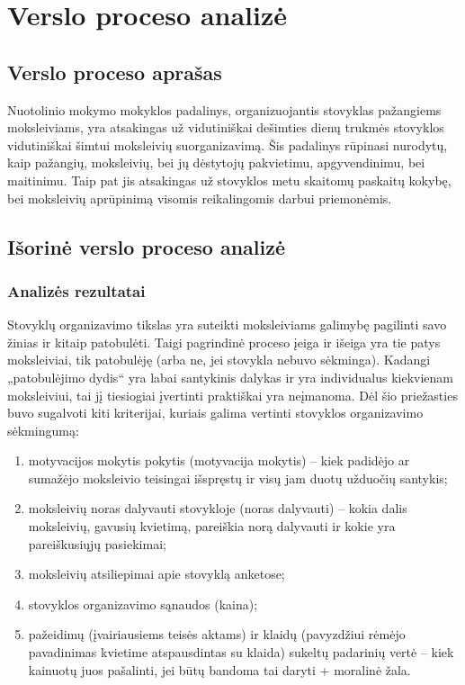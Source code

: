 \chapter{Verslo proceso analizė}


\section{Verslo proceso aprašas}

Nuotolinio mokymo mokyklos padalinys, organizuojantis stovyklas pažangiems
moksleiviams, yra atsakingas už vidutiniškai dešimties dienų trukmės
stovyklos vidutiniškai šimtui moksleivių suorganizavimą. Šis padalinys
rūpinasi nurodytų, kaip pažangių, moksleivių, bei jų dėstytojų pakvietimu, 
apgyvendinimu, bei maitinimu. Taip pat jis atsakingas už stovyklos metu 
skaitomų paskaitų kokybę, bei moksleivių aprūpinimą visomis reikalingomis
darbui priemonėmis.

\section{Išorinė verslo proceso analizė}

\subsection{Analizės rezultatai}

Stovyklų organizavimo tikslas yra suteikti moksleiviams galimybę pagilinti
savo žinias ir kitaip patobulėti. Taigi pagrindinė proceso įeiga ir išeiga
yra tie patys moksleiviai, tik patobulėję (arba ne, jei stovykla nebuvo
sėkminga). Kadangi „patobulėjimo dydis“ yra labai santykinis dalykas ir yra 
individualus kiekvienam moksleiviui, tai jį tiesiogiai įvertinti praktiškai
yra neįmanoma. Dėl šio priežasties buvo sugalvoti kiti kriterijai, kuriais
galima vertinti stovyklos organizavimo sėkmingumą:

\begin{enumerate}
  \item motyvacijos mokytis pokytis (motyvacija mokytis) – kiek padidėjo
    ar sumažėjo moksleivio teisingai išspręstų ir visų jam duotų užduočių
    santykis;
  \item moksleivių noras dalyvauti stovykloje (noras dalyvauti) – kokia 
    dalis moksleivių, gavusių kvietimą, pareiškia norą dalyvauti ir kokie 
    yra pareiškusiųjų pasiekimai;
  \item moksleivių atsiliepimai apie stovyklą anketose;
  \item stovyklos organizavimo sąnaudos (kaina);
  \item pažeidimų (įvairiausiems teisės aktams) ir klaidų (pavyzdžiui
    rėmėjo pavadinimas kvietime atspausdintas su klaida) sukeltų padarinių
    vertė – kiek kainuotų juos pašalinti, jei būtų bandoma tai daryti + 
    moralinė žala.
\end{enumerate}

